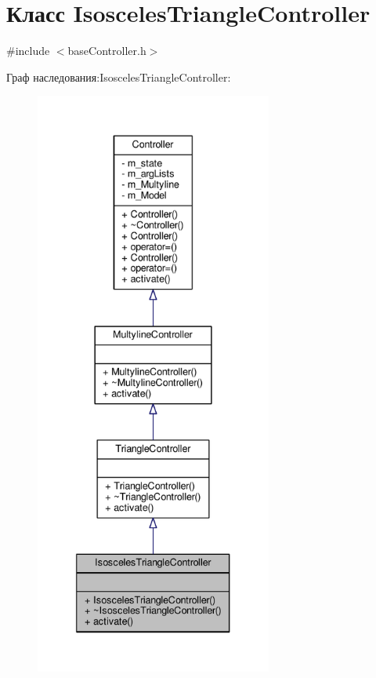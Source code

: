 \hypertarget{class_isosceles_triangle_controller}{\section{Класс Isosceles\-Triangle\-Controller}
\label{class_isosceles_triangle_controller}
}


{\ttfamily \#include $<$base\-Controller.\-h$>$}



Граф наследования\-:Isosceles\-Triangle\-Controller\-:
\nopagebreak
\begin{figure}[H]
\begin{center}
\leavevmode
\includegraphics[height=550pt]{class_isosceles_triangle_controller__inherit__graph}
\end{center}
\end{figure}


